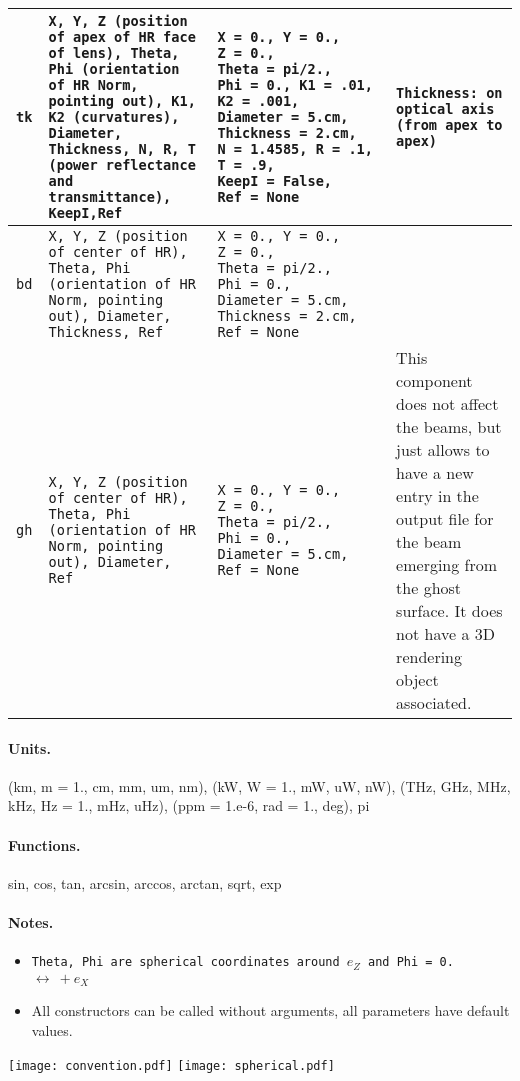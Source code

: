 \documentclass[a4paper, landscape]{article}
\begin{document}
\begin{tabular}{| p{.6cm} | p{8cm}| p{8cm} | p{8cm} |}
\tt{tk} & \tt{X}, \tt{Y}, \tt{Z} (position of apex of HR face of lens), \tt{Theta}, \tt{Phi} (orientation of HR Norm, pointing out), \tt{K1}, \tt{K2} (curvatures), \tt{Diameter},  \tt{Thickness}, \tt{N}, \tt{R}, \tt{T} (power reflectance and transmittance), \tt{KeepI},\tt{Ref} & \tt{X}~=~0., \tt{Y}~=~0., \tt{Z}~=~0., \tt{Theta}~=~pi/2., \tt{Phi}~=~0., \tt{K1}~=~.01, \tt{K2}~=~.001, \tt{Diameter}~=~5.cm,  \tt{Thickness}~=~2.cm, \tt{N}~=~1.4585, \tt{R}~=~.1, \tt{T}~=~.9, \tt{KeepI}~=~False,  \tt{Ref}~=~None & \tt{Thickness}: on optical axis (from apex to apex) \\ \hline

\tt{bd} & \tt{X}, \tt{Y}, \tt{Z} (position of center of HR), \tt{Theta}, \tt{Phi} (orientation of HR Norm, pointing out), \tt{Diameter},  \tt{Thickness}, \tt{Ref} & \tt{X}~=~0., \tt{Y}~=~0., \tt{Z}~=~0., \tt{Theta}~=~pi/2., \tt{Phi}~=~0., \tt{Diameter}~=~5.cm,  \tt{Thickness}~=~2.cm,  \tt{Ref}~=~None & \\ \hline

\tt{gh} & \tt{X}, \tt{Y}, \tt{Z} (position of center of HR), \tt{Theta}, \tt{Phi} (orientation of HR Norm, pointing out), \tt{Diameter}, \tt{Ref} & \tt{X}~=~0., \tt{Y}~=~0., \tt{Z}~=~0., \tt{Theta}~=~pi/2., \tt{Phi}~=~0., \tt{Diameter}~=~5.cm, \tt{Ref}~=~None & This component does not affect the beams, but just allows to have a new entry in the output file for the beam emerging from the ghost surface. It does not have a 3D rendering object associated. \\ \hline
\end{tabular}

\begin{multicols}{2}

\paragraph{Units.}(km, m = 1., cm, mm, um, nm), (kW, W = 1., mW, uW, nW), (THz, GHz, MHz, kHz, Hz = 1., mHz, uHz), (ppm = 1.e-6, rad = 1., deg), pi
\paragraph{Functions.} sin, cos, tan, arcsin, arccos, arctan, sqrt, exp

\paragraph{Notes.}\begin{itemize}
\item \tt{Theta}, \tt{Phi} are spherical coordinates around $e_Z$ and \tt{Phi = 0.} $\leftrightarrow~ + e_X$
\item All constructors can be called without arguments, all parameters have default values.
\end{itemize}

\texttt{[image: convention.pdf]}
\texttt{[image: spherical.pdf]}



\end{multicols}
\end{document}
